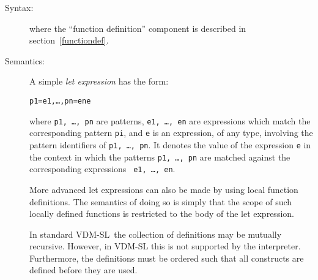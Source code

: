 \documentclass[\pformat,12pt]{article}
\newcommand{\vdmslpp}[2]{%
#1
}
\newcommand{\vdmsl}{VDM-SL}
\newcommand{\vdmpp}{VDM++}
\begin{document}
\begin{description}
\item[Syntax:]





  \noindent where the ``function definition'' component is described in
  section~\ref{functiondef}.

\item[Semantics:] A simple {\it let expression} has the form:
  \begin{alltt}
     p1 = e1, \ldots, pn = en  e
  \end{alltt}
  where {\tt p1, \ldots, pn} are patterns, {\tt e1, \ldots, en} are
  expressions which match the corresponding pattern {\tt pi}, and
  {\tt e} is an expression, of any type, involving the pattern
  identifiers of {\tt p1, \ldots, pn}. It denotes the value of the
  expression {\tt e} in the context in which the patterns {\tt p1,
    \ldots, pn} are matched against the corresponding expressions {\tt
    e1, \ldots, en}.

  More advanced let expressions can also be made by using local
  function definitions. The semantics of doing so is simply that the
  scope of such locally defined functions is restricted to the body of
  the let expression.

  In standard \vdmsl\ the collection of definitions may be mutually
  recursive.  However, in  \vdmslpp{\vdmsl}{\vdmpp} this is not
  supported by the interpreter.  Furthermore, the definitions must be
  ordered such that all constructs are defined before they are used.
     

\end{description}
\end{document}
